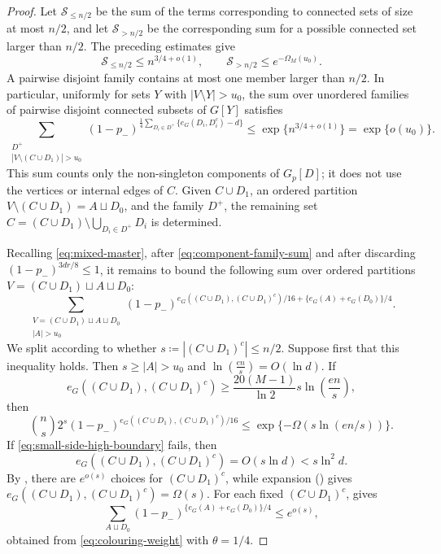 \documentclass[10pt,a4paper]{amsart}
\begin{document}
\begin{proof}
Let $\mathcal{S}_{\le n/2}$ be the sum of the terms corresponding to connected sets of size at most $n/2$, and let $\mathcal{S}_{>n/2}$ be the corresponding sum for a possible connected set larger than $n/2$.
The preceding estimates give
\[
 \mathcal{S}_{\le n/2}\le n^{3/4+o(1)},
 \qquad
 \mathcal{S}_{>n/2}\le e^{-\Omega_M(u_0)}.
\]
A pairwise disjoint family contains at most one member larger than $n/2$.
In particular, uniformly for sets $Y$ with $|V\setminus Y|>u_0$, the sum over unordered families of pairwise disjoint connected subsets of $G[Y]$ satisfies
\begin{equation}\label{eq:component-family-sum}
 \sum_{\substack{D^+\\|V\setminus (C \cup D_1)|>u_0}}
 (1-p_-)^{\frac14\sum_{D_i\in D^+}\{e_G(D_i, D_i^c)-d\}}
 \le\exp\{n^{3/4+o(1)}\}
 =\exp\{o(u_0)\}.
\end{equation}
This sum counts only the non-singleton components of $G_p[D]$; it does not use the vertices or internal edges of $C$. Given $C \cup D_1$, an ordered partition $V\setminus (C \cup D_1)=A\sqcup D_0$, and the family $D^+$, the remaining set
$C=(C \cup D_1)\setminus\bigcup_{D_i\in D^+}D_i$ is determined.

Recalling \eqref{eq:mixed-master}, after \eqref{eq:component-family-sum} and after discarding $(1-p_-)^{3dr/8}\le1$, it remains to bound the following sum over ordered partitions $V=(C \cup D_1)\sqcup A\sqcup D_0$:
\begin{equation}\label{eq:ordered-partition-sum}
  \sum_{\substack{V=(C \cup D_1)\sqcup A\sqcup D_0\\
 |A|>u_0}}  (1-p_-)^{e_G((C \cup D_1), (C \cup D_1)^c)/16+\{e_G(A)+e_G(D_0)\}/4}.  
\end{equation}
We split according to whether $s \coloneqq |(C \cup D_1)^c|\le n/2$. Suppose first that this inequality holds. Then $s\ge |A|>u_0$ and $\ln\left(\frac{en}{s}\right)=O(\ln d)$.
If
\begin{equation}\label{eq:small-side-high-boundary}
 e_G((C \cup D_1), (C \cup D_1)^c) \ge \frac{20(M-1)}{\ln 2}s\ln\left(\frac{en}{s}\right),
\end{equation}
then
\[
 \binom ns2^s (1-p_-)^{e_G((C \cup D_1), (C \cup D_1)^c)/16}
 \le \exp\{-\Omega(s\ln(en/s))\}.
\]
If \eqref{eq:small-side-high-boundary} fails, then
\[
 e_G((C \cup D_1), (C \cup D_1)^c)=O(s\ln d)<s\ln^2 d.
\]
By , there are $e^{o(s)}$ choices for $(C \cup D_1)^c$, while expansion () gives $e_G((C \cup D_1), (C \cup D_1)^c)= \Omega(s)$.
For each fixed $(C \cup D_1)^c$,  gives
\[
 \sum_{A\sqcup D_0}  (1-p_-)^{\{e_G(A)+e_G(D_0)\}/4}\le e^{o(s)},
\]
obtained from \eqref{eq:colouring-weight} with $\theta=1/4$.


\end{proof}
\end{document}
